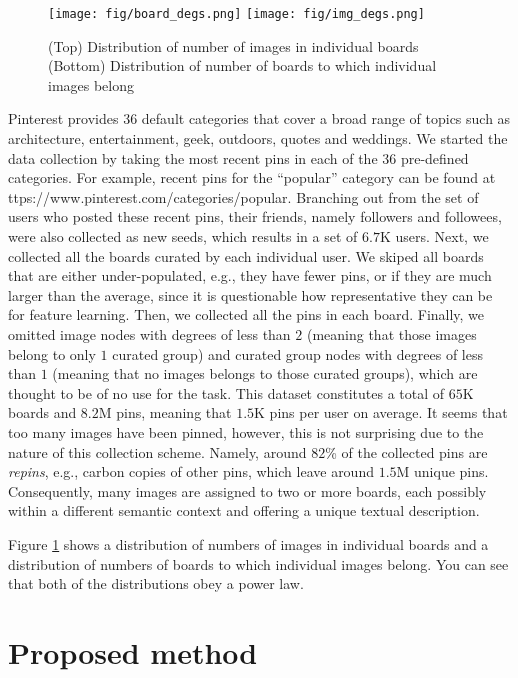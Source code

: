 \documentclass[letterpaper]{article} %
\begin{document}
\begin{figure}[t]
  \centering
  \texttt{[image: fig/board\_degs.png]}
  \texttt{[image: fig/img\_degs.png]}
  \caption{%
    (Top)    Distribution of number of images in individual boards
    (Bottom) Distribution of number of boards to which individual images belong
  }
  \label{fig:degs}
\end{figure}

Pinterest provides 36 default categories that cover a broad range of topics such as architecture, entertainment, geek, outdoors, quotes and weddings.
%
We started the data collection by taking the most recent pins in each of the 36 pre-defined categories.
%
For example, recent pins for the “popular” category can be found at ttps://www.pinterest.com/categories/popular. %
%
Branching out from the set of users who posted these recent pins, their friends, namely followers and followees, were also collected as new seeds, which results in a set of $6.7$K users.
%
Next, we collected all the boards curated by each individual user.
%
We skiped all boards that are either under-populated, e.g., they have fewer pins, or if they are much larger than the average, since it is questionable how representative they can be for feature learning.
%
Then, we collected all the pins in each board.
%
Finally, we omitted image nodes with degrees of less than $2$ (meaning that those images belong to only $1$ curated group) and curated group nodes with degrees of less than $1$ (meaning that no images belongs to those curated groups), which are thought to be of no use for the task.
%
This dataset constitutes a total of $65$K boards and $8.2$M pins, meaning that $1.5$K pins per user on average.
%
It seems that too many images have been pinned, however, this is not surprising due to the nature of this collection scheme.
%
Namely, around $82$\% of the collected pins are \emph{repins}, e.g., carbon copies of other pins, which leave around $1.5$M unique pins.
%
Consequently, many images are assigned to two or more boards, each possibly within a different semantic context and offering a unique textual description.

Figure \ref{fig:degs} shows a distribution of numbers of images in individual boards and a distribution of numbers of boards to which individual images belong.
%
You can see that both of the distributions obey a power law.


\section{Proposed method}
\label{sec:proposed}
\end{document}
